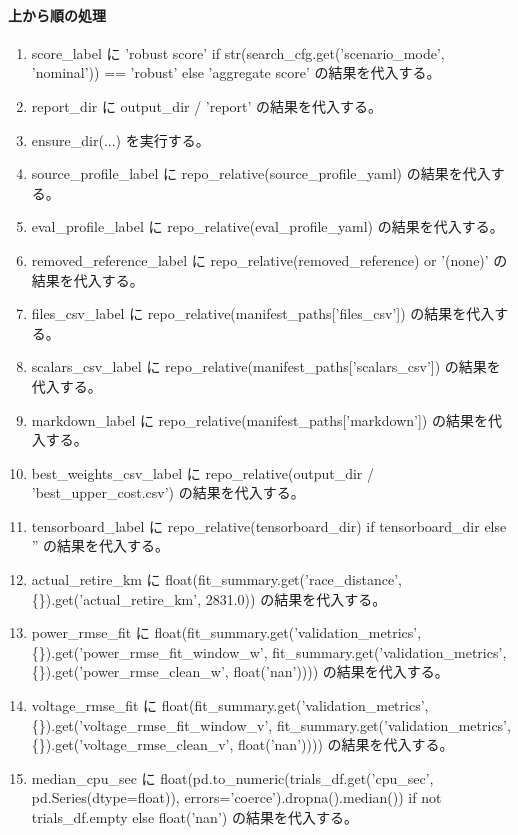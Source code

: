 \documentclass[a4paper,11pt]{article}
\begin{document}
            \paragraph{上から順の処理}
            \begin{enumerate}[leftmargin=1.8em]
            \item score\_label に 'robust score' if str(search\_cfg.get('scenario\_mode', 'nominal')) == 'robust' else 'aggregate score' の結果を代入する。
\item report\_dir に output\_dir / 'report' の結果を代入する。
\item ensure\_dir(...) を実行する。
\item source\_profile\_label に repo\_relative(source\_profile\_yaml) の結果を代入する。
\item eval\_profile\_label に repo\_relative(eval\_profile\_yaml) の結果を代入する。
\item removed\_reference\_label に repo\_relative(removed\_reference) or '(none)' の結果を代入する。
\item files\_csv\_label に repo\_relative(manifest\_paths['files\_csv']) の結果を代入する。
\item scalars\_csv\_label に repo\_relative(manifest\_paths['scalars\_csv']) の結果を代入する。
\item markdown\_label に repo\_relative(manifest\_paths['markdown']) の結果を代入する。
\item best\_weights\_csv\_label に repo\_relative(output\_dir / 'best\_upper\_cost.csv') の結果を代入する。
\item tensorboard\_label に repo\_relative(tensorboard\_dir) if tensorboard\_dir else '' の結果を代入する。
\item actual\_retire\_km に float(fit\_summary.get('race\_distance', \{\}).get('actual\_retire\_km', 2831.0)) の結果を代入する。
\item power\_rmse\_fit に float(fit\_summary.get('validation\_metrics', \{\}).get('power\_rmse\_fit\_window\_w', fit\_summary.get('validation\_metrics', \{\}).get('power\_rmse\_clean\_w', float('nan')))) の結果を代入する。
\item voltage\_rmse\_fit に float(fit\_summary.get('validation\_metrics', \{\}).get('voltage\_rmse\_fit\_window\_v', fit\_summary.get('validation\_metrics', \{\}).get('voltage\_rmse\_clean\_v', float('nan')))) の結果を代入する。
\item median\_cpu\_sec に float(pd.to\_numeric(trials\_df.get('cpu\_sec', pd.Series(dtype=float)), errors='coerce').dropna().median()) if not trials\_df.empty else float('nan') の結果を代入する。

\end{enumerate}
\end{document}
